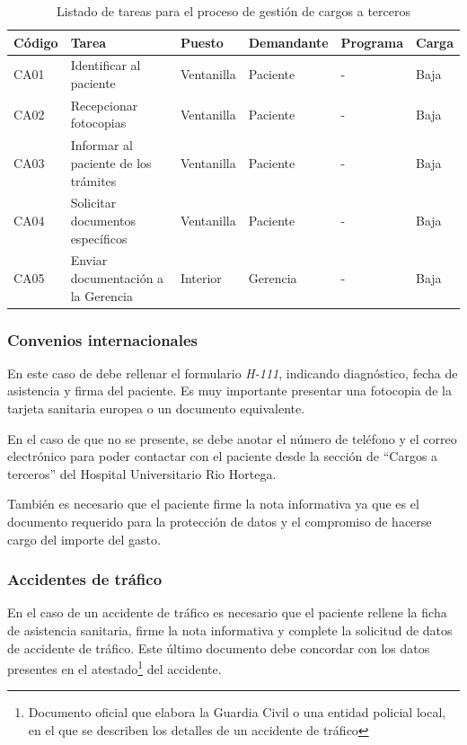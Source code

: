 \begin{table}[H]
    \begin{tabular}{lp{5cm}llll}
        \toprule
        Código & Tarea                                & Puesto     & Demandante & Programa & Carga \\
        \midrule
        CA01   & Identificar al paciente              & Ventanilla & Paciente   & -        & Baja  \\
        CA02   & Recepcionar fotocopias               & Ventanilla & Paciente   & -        & Baja  \\
        CA03   & Informar al paciente de los trámites & Ventanilla & Paciente   & -        & Baja  \\
        CA04   & Solicitar documentos específicos     & Ventanilla & Paciente   & -        & Baja  \\
        CA05   & Enviar documentación a la Gerencia   & Interior   & Gerencia   & -        & Baja  \\
        \bottomrule
    \end{tabular}
    \caption{Listado de tareas para el proceso de gestión de cargos a terceros}
    \label{tab:proceso-cargos}
\end{table}

\subsubsection{Convenios internacionales}

En este caso de debe rellenar el formulario \textit{H-111}, indicando diagnóstico, fecha de asistencia y firma del paciente.
Es muy importante presentar una fotocopia de la tarjeta sanitaria europea o un documento equivalente.

En el caso de que no se presente, se debe anotar el número de teléfono y el correo electrónico para poder contactar con el paciente desde la sección de ``Cargos a terceros'' del Hospital Universitario Rio Hortega.

También es necesario que el paciente firme la nota informativa ya que es el documento requerido para la protección de datos y el compromiso de hacerse cargo del importe del gasto.

\subsubsection{Accidentes de tráfico}

En el caso de un accidente de tráfico es necesario que el paciente rellene la ficha de asistencia sanitaria, firme la nota informativa y complete la solicitud de datos de accidente de tráfico.
Este último documento debe concordar con los datos presentes en el atestado\footnote{Documento oficial que elabora la Guardia Civil o una entidad policial local, en el que se describen los detalles de un accidente de tráfico} del accidente.

